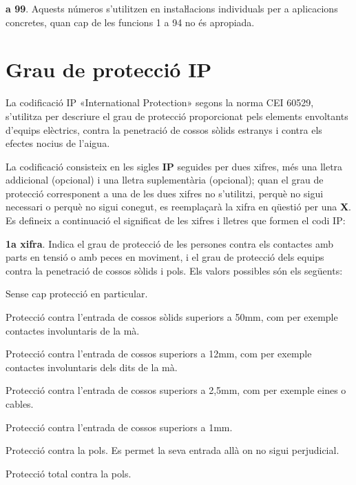 \begin{multicols}{2}
\begin{list}{}
\item[\textbf{95}] \textbf{a 99}. Aquests números s'utilitzen en instaŀlacions
individuals per a aplicacions concretes, quan cap de les funcions 1
a 94 no és apropiada.

\end{list}
\end{multicols}


\section{Grau de protecció IP}   

La codificació IP «International Protection»  segons la
norma CEI 60529, s'utilitza per descriure el grau de
protecció  proporcionat pels elements envoltants d'equips elèctrics, contra
la penetració de cossos sòlids estranys i contra els efectes nocius
de l'aigua.

La codificació consisteix en les sigles \textbf{IP}
seguides per dues xifres, més una lletra addicional (opcional) i una
lletra suplementària (opcional); quan el grau de protecció
corresponent a una de les dues xifres no s'utilitzi, perquè no sigui
necessari o perquè no sigui conegut, es reemplaçarà la xifra en
qüestió per una \textbf{X}. Es defineix a continuació el
significat de les xifres i lletres que formen el codi IP:

\textbf{1a xifra}. Indica el grau de protecció de les persones contra els contactes amb
parts en tensió o amb peces en moviment, i el grau de protecció dels equips contra la
penetració de cossos sòlids i pols. Els valors possibles són els següents:
\begin{list}{}
   {\setlength{\labelwidth}{10mm} \setlength{\leftmargin}{10mm} \setlength{\labelsep}{2mm}}
   \item[\textbf{0}] Sense cap protecció en particular.
   \item[\textbf{1}] Protecció contra l'entrada de cossos sòlids superiors a 50\unit{mm},
   com per exemple   contactes involuntaris de la mà.
   \item[\textbf{2}] Protecció contra l'entrada de cossos superiors a 12\unit{mm}, com per exemple
   contactes involuntaris dels dits de la mà.
   \item[\textbf{3}] Protecció contra l'entrada de cossos superiors a 2,5\unit{mm},
   com per exemple eines o cables.
   \item[\textbf{4}] Protecció contra l'entrada de cossos superiors a 1\unit{mm}.
   \item[\textbf{5}] Protecció contra la pols. Es permet la seva entrada allà on no sigui perjudicial.
   \item[\textbf{6}] Protecció total contra la pols.
\end{list}

